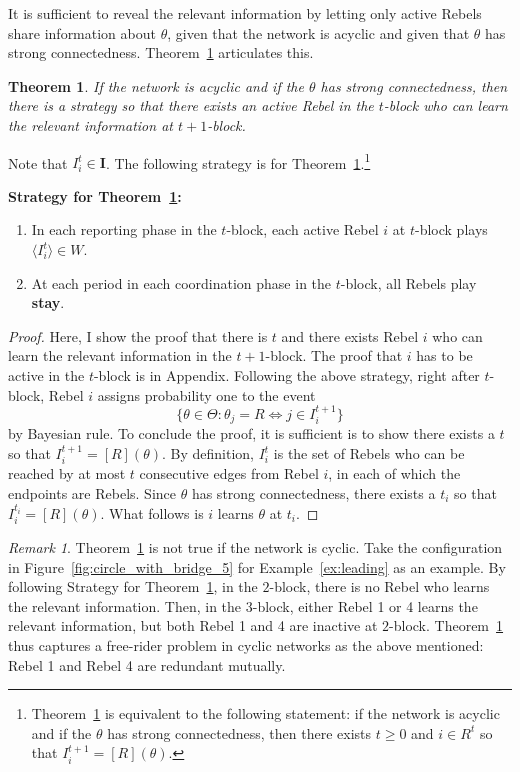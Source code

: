 \documentclass[12pt,letter]{article}
\newtheorem{theorem}{Theorem}
\theoremstyle{definition}
\theoremstyle{remark}
\newtheorem*{remark}{Remark}
\theoremstyle{claim}
\begin{document}
It is sufficient to reveal the relevant information by letting only active Rebels share information about $\theta$, given that the network is acyclic and given that $\theta$ has strong connectedness. Theorem~\ref{lemma_empty} articulates this.
\begin{theorem}
\label{lemma_empty}
If the network is acyclic and if the $\theta$ has strong connectedness, then there is a strategy so that there exists an active Rebel in the $t$-block who can learn the relevant information at $t+1$-block.
\end{theorem}
Note that $I^t_i\in \mathbf{I}$. The following strategy is for Theorem~\ref{lemma_empty}.\footnote{Theorem~\ref{lemma_empty} is equivalent to the following statement: if the network is acyclic and if the $\theta$ has strong connectedness, then there exists $t\geq 0$ and $i\in R^t$ so that $I^{t+1}_i=[R](\theta)$.} 
\begin{center}
\textbf{Strategy for Theorem~\ref{lemma_empty}:}
\begin{enumerate}
\item In each reporting phase in the $t$-block, each active Rebel $i$ at $t$-block plays $\langle {I^t_i} \rangle\in W$.
\item At each period in each coordination phase in the $t$-block, all Rebels play \textbf{stay}.
\end{enumerate}
\end{center}
\begin{proof} 
Here, I show the proof that there is $t$ and there exists Rebel $i$ who can learn the relevant information in the $t+1$-block. The proof that $i$ has to be active in the $t$-block is in Appendix.  Following the above strategy, right after $t$-block, Rebel $i$ assigns probability one to the event 
\[\{\theta\in \Theta: \text{$\theta_j=R \Leftrightarrow j\in I^{t+1}_i$}\}\] 
by Bayesian rule. To conclude the proof, it is sufficient is to show there exists a $t$ so that $I^{t+1}_i=[R](\theta)$. By definition, $I^t_i$ is the set of Rebels who can be reached by at most $t$ consecutive edges from Rebel $i$, in each of which the endpoints are Rebels. Since $\theta$ has strong connectedness, there exists a $t_i$ so that $I^{t_i}_i=[R](\theta)$. What follows is $i$ learns $\theta$ at $t_i$.
\end{proof}
\begin{remark}
Theorem~\ref{lemma_empty} is not true if the network is cyclic. Take the configuration in Figure~\ref{fig:circle_with_bridge_5} for Example~\ref{ex:leading} as an example. By following Strategy for Theorem~\ref{lemma_empty}, in the $2$-block, there is no Rebel who learns the relevant information. Then, in the $3$-block, either Rebel 1 or 4 learns the relevant information, but both Rebel 1 and 4 are inactive at $2$-block. Theorem~\ref{lemma_empty} thus captures a free-rider problem in cyclic networks as the above mentioned: Rebel 1 and Rebel 4 are redundant mutually.
\end{remark}
\end{document}
